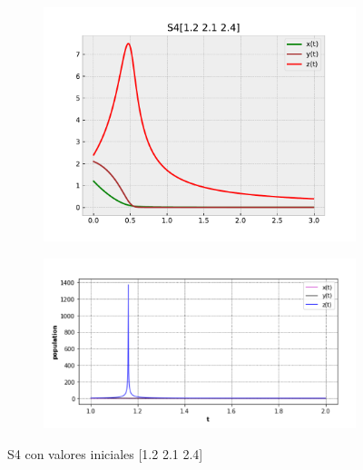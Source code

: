 \documentclass{wscpaperproc}
\theoremstyle{wsc}
\begin{document}
\begin{figure}[h]
	\centering
	\begin{subfigure}[b]{0.5\textwidth}
		\centering
		\includegraphics[width=\textwidth]{Simulations/S4[1.2 2.1 2.4].pdf}
	
		\label{fig:comparativa81}
	\end{subfigure}%
	\begin{subfigure}[b]{0.5\textwidth}
		\centering
		\includegraphics[width=\textwidth]{GraficasPaper/S4[1].png}
		\label{fig:comparativa82}
	\end{subfigure}
	\caption{S4 con valores iniciales [1.2 2.1 2.4]}

	\label{fig:comparacion11}
\end{figure}
\end{document}
